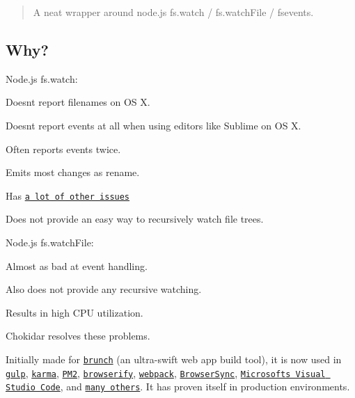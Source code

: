 \begin{quote}
A neat wrapper around node.\+js fs.\+watch / fs.\+watch\+File / fsevents. \end{quote}


\href{https://nodei.co/npm/chokidar/}{\tt } \href{https://nodei.co/npm/chokidar/}{\tt }

\subsection*{Why?}

Node.\+js {\ttfamily fs.\+watch}\+:


\begin{DoxyItemize}
\item Doesn\textquotesingle{}t report filenames on OS X.
\item Doesn\textquotesingle{}t report events at all when using editors like Sublime on OS X.
\item Often reports events twice.
\item Emits most changes as {\ttfamily rename}.
\item Has \href{https://github.com/nodejs/node/search?q=fs.watch&type=Issues}{\tt a lot of other issues}
\item Does not provide an easy way to recursively watch file trees.
\end{DoxyItemize}

Node.\+js {\ttfamily fs.\+watch\+File}\+:


\begin{DoxyItemize}
\item Almost as bad at event handling.
\item Also does not provide any recursive watching.
\item Results in high C\+PU utilization.
\end{DoxyItemize}

Chokidar resolves these problems.

Initially made for \href{http://brunch.io}{\tt brunch} (an ultra-\/swift web app build tool), it is now used in \href{https://github.com/gulpjs/gulp/}{\tt gulp}, \href{http://karma-runner.github.io}{\tt karma}, \href{https://github.com/Unitech/PM2}{\tt P\+M2}, \href{http://browserify.org/}{\tt browserify}, \href{http://webpack.github.io/}{\tt webpack}, \href{http://www.browsersync.io/}{\tt Browser\+Sync}, \href{https://github.com/microsoft/vscode}{\tt Microsoft\textquotesingle{}s Visual Studio Code}, and \href{https://www.npmjs.org/browse/depended/chokidar/}{\tt many others}. It has proven itself in production environments.

